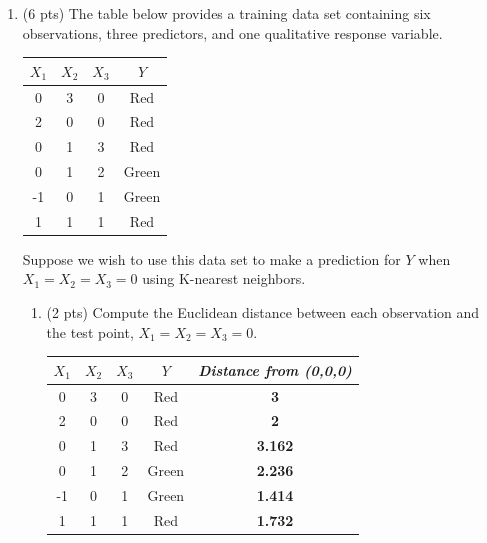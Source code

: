 \documentclass[a4paper]{article}
\theoremstyle{definition}
\newenvironment{soln}{
    \leavevmode\color{blue}\ignorespaces
}{}
\begin{document}
\begin{enumerate}
\begin{enumerate}
\end{enumerate}

\item (6 pts) The table below provides a training data set containing six observations, three predictors, and one qualitative response variable.

\begin{center}
	\begin{tabular}{ c  c  c  c}
		\hline
		$X_{1}$ & $X_{2}$ & $X_{3}$ & $Y$ \\ \hline
		0 & 3 & 0 & Red \\
		2 & 0 & 0 & Red \\
		0 & 1 & 3 & Red \\
		0 & 1 & 2 & Green \\
		-1 & 0 & 1 & Green \\
		1 & 1 & 1 & Red  \\
		\hline
	\end{tabular}
\end{center}

Suppose we wish to use this data set to make a prediction for $Y$ when $X_{1} = X_{2} = X_{3} = 0$ using K-nearest neighbors.

\begin{enumerate}
	\item (2 pts) Compute the Euclidean distance between each observation and the test point, $X_{1} = X_{2} = X_{3}=0$.
 
	\begin{soln}
            \begin{center}
                \begin{tabular}{ c  c  c  c| c}
        		\hline
        		$X_{1}$ & $X_{2}$ & $X_{3}$ & $Y$ & \textit{Distance from (0,0,0)} \\ \hline
        		0 & 3 & 0 & Red & \textbf{3} \\
        		2 & 0 & 0 & Red & \textbf{2} \\
        		0 & 1 & 3 & Red & \textbf{3.162} \\
        		0 & 1 & 2 & Green & \textbf{2.236} \\
        		-1 & 0 & 1 & Green & \textbf{1.414} \\
        		1 & 1 & 1 & Red & \textbf{1.732}  \\
        		\hline
        	\end{tabular}
            \end{center}
        \end{soln}
 

\end{enumerate}
\end{enumerate}
\end{document}
